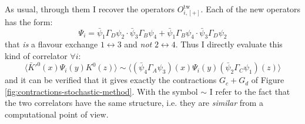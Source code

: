 \documentclass[english, LaM, oneside, noexaminfo]{sapthesis}
\begin{document}
As usual, through them I recover the operators $O_{i,[+]}^\text{tw}$.
Each of the new operators has the form:
$$\Psi_i = \bar\psi_1 \Gamma_D \psi_2 \cdot \bar\psi_3 \Gamma_B \psi_4 + \bar\psi_1 \Gamma_B \psi_4 \cdot \bar\psi_3 \Gamma_D \psi_2$$
that {\it is} a flavour exchange $1 \leftrightarrow 3$ and {\it not} $2 \leftrightarrow 4$.
Thus I directly evaluate this kind of correlator $\forall i$:
$$\bigg\langle \bar K'^0(x) \Psi_i (y) K^0(z) \bigg\rangle \sim \bigg\langle \left(\bar\psi_4 \Gamma_A \psi_3 \right) (x) \Psi_i (y) \left(\bar\psi_2 \Gamma_C \psi_1 \right) (z) \bigg\rangle$$
and it can be verified that it gives exactly the contractions $G_c + G_d$ of Figure \ref{fig:contractions-stochastic-method}.
With the symbol $\sim$ I refer to the fact that the two correlators have the same structure, i.e. they are {\it similar} from a computational point of view.

\newpage
\end{document}
